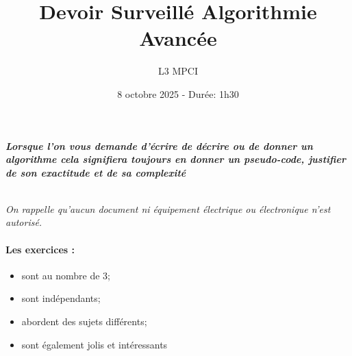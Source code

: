 \documentclass{article}
\title{Devoir Surveillé Algorithmie Avancée}
\author{L3 MPCI}
\date{8 octobre 2025 - Durée: 1h30}
\theoremstyle{exostyle}
\theoremstyle{partiestyle}
\theoremstyle{questionstyle}
\begin{document}
\maketitle

\begin{center}
{\em\bf Lorsque l'on vous demande d'écrire de décrire ou de donner un algorithme cela signifiera toujours en donner un pseudo-code, justifier de son exactitude et de sa complexité}

~\\

{\em On rappelle qu'aucun document ni équipement électrique ou électronique n'est autorisé. }
\end{center}


\paragraph*{Les exercices :}
\begin{itemize}
\item sont au nombre de 3;
\item sont indépendants;
\item abordent des sujets différents;
\item sont également jolis et intéressants 
\end{itemize}

\clearpage
\end{document}
